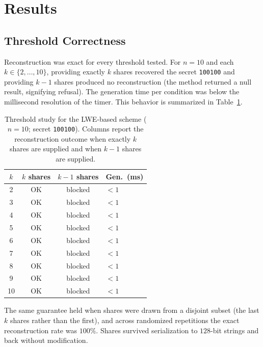\documentclass[preprint,12pt,number]{elsarticle}
\begin{document}
\section{Results}
\label{sec:results}

\subsection{Threshold Correctness}

Reconstruction was exact for every threshold tested. For $n = 10$ and each
$k \in \{2,\dots,10\}$, providing exactly $k$ shares recovered the secret
\texttt{100100} and providing $k-1$ shares produced no reconstruction (the
method returned a null result, signifying refusal). The generation time per
condition was below the millisecond resolution of the timer. This behavior is
summarized in Table~\ref{tab:threshold}.

\begin{table}[t]
\centering
\caption{Threshold study for the LWE-based scheme ($n = 10$; secret
\texttt{100100}). Columns report the reconstruction outcome when exactly $k$
shares are supplied and when $k-1$ shares are supplied.}
\label{tab:threshold}
\begin{tabular}{cccl}
\toprule
$k$ & $k$ shares & $k-1$ shares & Gen.\ (ms)\\
\midrule
2  & OK & blocked & $<1$\\
3  & OK & blocked & $<1$\\
4  & OK & blocked & $<1$\\
5  & OK & blocked & $<1$\\
6  & OK & blocked & $<1$\\
7  & OK & blocked & $<1$\\
8  & OK & blocked & $<1$\\
9  & OK & blocked & $<1$\\
10 & OK & blocked & $<1$\\
\bottomrule
\end{tabular}
\end{table}

The same guarantee held when shares were drawn from a disjoint subset (the last
$k$ shares rather than the first), and across randomized repetitions the exact
reconstruction rate was $100\%$. Shares survived serialization to $128$-bit
strings and back without modification.
\end{document}
